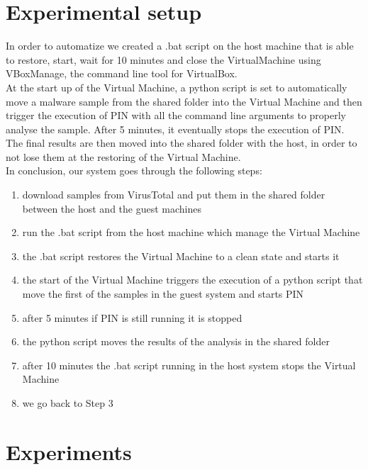 \section{Experimental setup}
In order to automatize we created a .bat script on the host machine that is able to restore, start, wait for 10 minutes and close the VirtualMachine using VBoxManage, the command line tool for VirtualBox.\\
At the start up of the Virtual Machine, a python script is set to automatically move a malware sample from the shared folder into the Virtual Machine and then trigger the execution of PIN with all the command line arguments to properly analyse the sample. After 5 minutes, it eventually stops the execution of PIN.\\
The final results are then moved into the shared folder with the host, in order to not lose them at the restoring of the Virtual Machine.\\
In conclusion, our system goes through the following steps:
\begin{enumerate}
\item download samples from VirusTotal and put them in the shared folder between the host and the guest machines
\item run the .bat script from the host machine which manage the Virtual Machine
\item the .bat script restores the Virtual Machine to a clean state and starts it
\item the start of the Virtual Machine triggers the execution of a python script that move the first of the samples in the guest system and starts PIN
\item after 5 minutes if PIN is still running it is stopped
\item the python script moves the results of the analysis in the shared folder
\item after 10 minutes the .bat script running in the host system stops the Virtual Machine
\item we go back to Step 3
\end{enumerate}

\section{Experiments}

